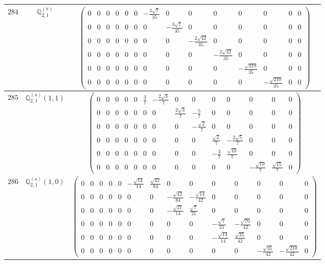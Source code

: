 \documentclass[fleqn,8pt,landscape]{jsarticle}
\begin{document}
\begin{center}
\begin{longtable}{ccc}
$ 284 $ & $ \mathbb{Q}_{2,1}^{(a)} $ & $ \begin{pmatrix} 0 & 0 & 0 & 0 & 0 & 0 & - \frac{3 \sqrt{7}}{35} & 0 & 0 & 0 & 0 & 0 & 0 & 0 \\ 0 & 0 & 0 & 0 & 0 & 0 & 0 & - \frac{3 \sqrt{7}}{35} & 0 & 0 & 0 & 0 & 0 & 0 \\ 0 & 0 & 0 & 0 & 0 & 0 & 0 & 0 & - \frac{2 \sqrt{42}}{35} & 0 & 0 & 0 & 0 & 0 \\ 0 & 0 & 0 & 0 & 0 & 0 & 0 & 0 & 0 & - \frac{2 \sqrt{42}}{35} & 0 & 0 & 0 & 0 \\ 0 & 0 & 0 & 0 & 0 & 0 & 0 & 0 & 0 & 0 & - \frac{\sqrt{210}}{35} & 0 & 0 & 0 \\ 0 & 0 & 0 & 0 & 0 & 0 & 0 & 0 & 0 & 0 & 0 & - \frac{\sqrt{210}}{35} & 0 & 0 \end{pmatrix} $ \\ \hline
$ 285 $ & $ \mathbb{Q}_{2,1}^{(a)}(1,1) $ & $ \begin{pmatrix} 0 & 0 & 0 & 0 & 0 & \frac{3}{7} & - \frac{2 \sqrt{3}}{7} & 0 & 0 & 0 & 0 & 0 & 0 & 0 \\ 0 & 0 & 0 & 0 & 0 & 0 & 0 & \frac{2 \sqrt{3}}{7} & - \frac{5}{7} & 0 & 0 & 0 & 0 & 0 \\ 0 & 0 & 0 & 0 & 0 & 0 & 0 & 0 & - \frac{\sqrt{2}}{7} & 0 & 0 & 0 & 0 & 0 \\ 0 & 0 & 0 & 0 & 0 & 0 & 0 & 0 & 0 & \frac{\sqrt{2}}{7} & - \frac{2 \sqrt{5}}{7} & 0 & 0 & 0 \\ 0 & 0 & 0 & 0 & 0 & 0 & 0 & 0 & 0 & - \frac{3}{7} & \frac{\sqrt{10}}{7} & 0 & 0 & 0 \\ 0 & 0 & 0 & 0 & 0 & 0 & 0 & 0 & 0 & 0 & 0 & - \frac{\sqrt{10}}{7} & \frac{\sqrt{15}}{7} & 0 \end{pmatrix} $ \\ \hline
$ 286 $ & $ \mathbb{Q}_{2,1}^{(a)}(1,0) $ & $ \begin{pmatrix} 0 & 0 & 0 & 0 & 0 & - \frac{\sqrt{14}}{14} & \frac{\sqrt{42}}{84} & 0 & 0 & 0 & 0 & 0 & 0 & 0 \\ 0 & 0 & 0 & 0 & 0 & 0 & 0 & - \frac{\sqrt{42}}{84} & - \frac{\sqrt{14}}{42} & 0 & 0 & 0 & 0 & 0 \\ 0 & 0 & 0 & 0 & 0 & 0 & 0 & - \frac{\sqrt{21}}{14} & \frac{\sqrt{7}}{21} & 0 & 0 & 0 & 0 & 0 \\ 0 & 0 & 0 & 0 & 0 & 0 & 0 & 0 & 0 & - \frac{\sqrt{7}}{21} & - \frac{\sqrt{70}}{42} & 0 & 0 & 0 \\ 0 & 0 & 0 & 0 & 0 & 0 & 0 & 0 & 0 & - \frac{\sqrt{14}}{14} & \frac{\sqrt{35}}{42} & 0 & 0 & 0 \\ 0 & 0 & 0 & 0 & 0 & 0 & 0 & 0 & 0 & 0 & 0 & - \frac{\sqrt{35}}{42} & - \frac{\sqrt{210}}{42} & 0 \end{pmatrix} $ \\ \hline

\end{longtable}
\end{center}
\end{document}
